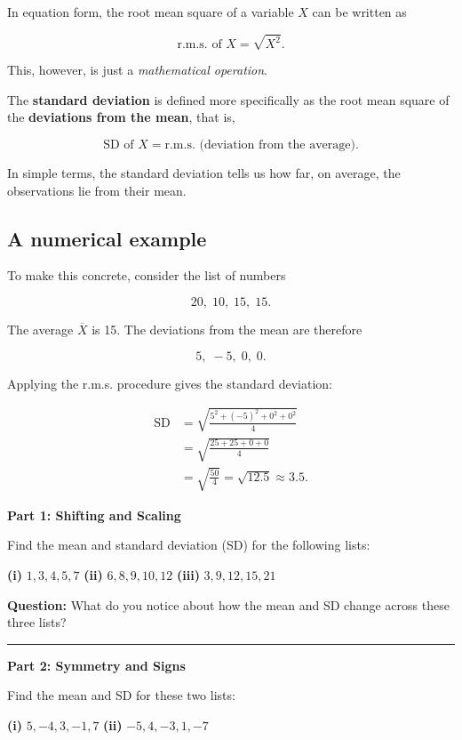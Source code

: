 \documentclass[
  letterpaper,
  DIV=11,
  numbers=noendperiod]{scrreprt}
\begin{document}
In equation form, the root mean square of a variable \(X\) can be
written as

\[
\text{r.m.s. of } X = \sqrt{X^2}.
\]

This, however, is just a \emph{mathematical operation}.

The \textbf{standard deviation} is defined more specifically as the root
mean square of the \textbf{deviations from the mean}, that is,

\[
\text{SD of } X = \text{r.m.s. (deviation from the average)}.
\]

In simple terms, the standard deviation tells us how far, on average,
the observations lie from their mean.

\subsection{A numerical example}\label{a-numerical-example}

To make this concrete, consider the list of numbers

\[
20,\; 10,\; 15,\; 15.
\]

The average \(\overline{X}\) is 15. The deviations from the mean are
therefore

\[
5,\; -5,\; 0,\; 0.
\]

Applying the r.m.s. procedure gives the standard deviation:

\[
\begin{aligned}
\text{SD}
&= \sqrt{\frac{5^2 + (-5)^2 + 0^2 + 0^2}{4}} \\
&= \sqrt{\frac{25 + 25 + 0 + 0}{4}} \\
&= \sqrt{\frac{50}{4}} = \sqrt{12.5} \approx 3.5.
\end{aligned}
\]

\begin{tcolorbox}[enhanced jigsaw, coltitle=black, colbacktitle=quarto-callout-tip-color!10!white, left=2mm, bottomrule=.15mm, bottomtitle=1mm, colback=white, titlerule=0mm, colframe=quarto-callout-tip-color-frame, breakable, leftrule=.75mm, toptitle=1mm, opacitybacktitle=0.6, rightrule=.15mm, title=\textcolor{quarto-callout-tip-color}{\faLightbulb}\hspace{0.5em}{Try This: Exploring Mean and SD}, arc=.35mm, opacityback=0, toprule=.15mm]

\textbf{Part 1: Shifting and Scaling}

Find the mean and standard deviation (SD) for the following lists:

\textbf{(i)} \(1, 3, 4, 5, 7\) \textbf{(ii)} \(6, 8, 9, 10, 12\)
\textbf{(iii)} \(3, 9, 12, 15, 21\)

\textbf{Question:} What do you notice about how the mean and SD change
across these three lists?

\begin{center}\rule{0.5\linewidth}{0.5pt}\end{center}

\textbf{Part 2: Symmetry and Signs}

Find the mean and SD for these two lists:

\textbf{(i)} \(5, -4, 3, -1, 7\) \textbf{(ii)} \(-5, 4, -3, 1, -7\)

\end{tcolorbox}
\end{document}

